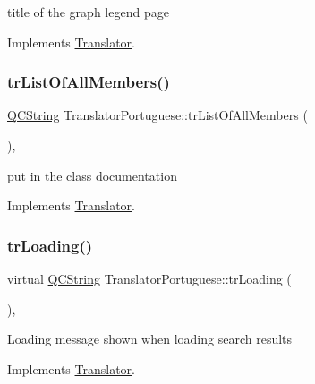 title of the graph legend page 

Implements \mbox{\hyperlink{class_translator}{Translator}}.

\mbox{\label{class_translator_portuguese_ab515ef96060b58670c6366af6a43a8f4}} 
\subsubsection{\texorpdfstring{trListOfAllMembers()}{trListOfAllMembers()}}
{\footnotesize\ttfamily \mbox{\hyperlink{class_q_c_string}{Q\+C\+String}} Translator\+Portuguese\+::tr\+List\+Of\+All\+Members (\begin{DoxyParamCaption}{ }\end{DoxyParamCaption})\hspace{0.3cm}{\ttfamily [inline]}, {\ttfamily [virtual]}}

put in the class documentation 

Implements \mbox{\hyperlink{class_translator}{Translator}}.

\mbox{\label{class_translator_portuguese_a969861b44113a334578a909ecd8ee931}} 
\subsubsection{\texorpdfstring{trLoading()}{trLoading()}}
{\footnotesize\ttfamily virtual \mbox{\hyperlink{class_q_c_string}{Q\+C\+String}} Translator\+Portuguese\+::tr\+Loading (\begin{DoxyParamCaption}{ }\end{DoxyParamCaption})\hspace{0.3cm}{\ttfamily [inline]}, {\ttfamily [virtual]}}

Loading message shown when loading search results 

Implements \mbox{\hyperlink{class_translator}{Translator}}.

\mbox{\label{class_translator_portuguese_a213360091f1c3ab1ab95de2abf1c7a34}} 
